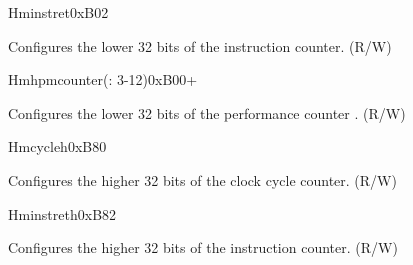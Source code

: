 \begin{register}{H}{minstret}{0xB02}\label{regdesc:LPMINSTRET}
%
\regnewline%
\begin{regdesc}\begin{reglist}
\label{fielddesc:LPMINSTRET}\item [MINSTRET] Configures the lower 32 bits of the instruction counter. (R/W)
\end{reglist}\end{regdesc}
\end{register}


\begin{register}{H}{mhpmcounter(: 3-12)}{0xB00+}\label{regdesc:LPMHPMCOUNTER}
%
\regnewline%
\begin{regdesc}\begin{reglist}
\label{fielddesc:LPMHMPCOUNTER}\item [MHPMCOUNTER\regindex{n}] Configures the lower 32 bits of the performance counter . (R/W)
\end{reglist}\end{regdesc}
\end{register}


\begin{register}{H}{mcycleh}{0xB80}\label{regdesc:LPMCYCLEH}
%
\regnewline%
\begin{regdesc}\begin{reglist}
\label{fielddesc:LPMCYCLEH}\item [MCYCLEH] Configures the higher 32 bits of the clock cycle counter. (R/W)
\end{reglist}\end{regdesc}
\end{register}

\begin{register}{H}{minstreth}{0xB82}\label{regdesc:LPMINSTRETH}
%
\regnewline%
\begin{regdesc}\begin{reglist}
\label{fielddesc:LPMINSTRETH}\item [MINSTRETH] Configures the higher 32 bits of the instruction counter. (R/W)
\end{reglist}\end{regdesc}
\end{register}



